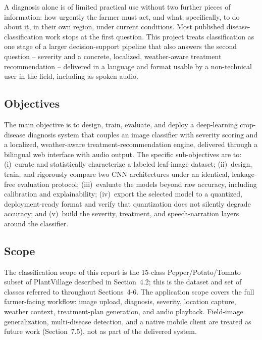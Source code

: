 \documentclass[12pt,a4paper]{article}
\begin{document}
A diagnosis alone is of limited practical use without two further pieces of
information: how urgently the farmer must act, and what, specifically, to do
about it, in their own region, under current conditions. Most published
disease-classification work stops at the first question. This project treats
classification as one stage of a larger decision-support pipeline that also
answers the second question -- severity and a concrete, localized,
weather-aware treatment recommendation -- delivered in a language and format
usable by a non-technical user in the field, including as spoken audio.

\subsection{Objectives}
The main objective is to design, train, evaluate, and deploy a deep-learning
crop-disease diagnosis system that couples an image classifier with severity
scoring and a localized, weather-aware treatment-recommendation engine,
delivered through a bilingual web interface with audio output. The specific
sub-objectives are to: (i)~curate and statistically characterize a labeled
leaf-image dataset; (ii)~design, train, and rigorously compare two CNN
architectures under an identical, leakage-free evaluation protocol;
(iii)~evaluate the models beyond raw accuracy, including calibration and
explainability; (iv)~export the selected model to a quantized,
deployment-ready format and verify that quantization does not silently
degrade accuracy; and (v)~build the severity, treatment, and
speech-narration layers around the classifier.

\subsection{Scope}
The classification scope of this report is the 15-class Pepper/Potato/Tomato
subset of PlantVillage described in Section~4.2; this is the dataset and set
of classes referred to throughout Sections~4-6. The application scope covers
the full farmer-facing workflow: image upload, diagnosis, severity, location
capture, weather context, treatment-plan generation, and audio playback.
Field-image generalization, multi-disease detection, and a native mobile
client are treated as future work (Section~7.5), not as part of the delivered
system.

\end{document}
